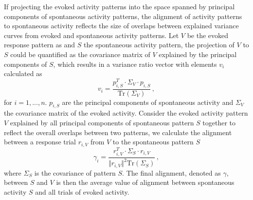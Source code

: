 \documentclass[11pt]{article}
\begin{document}
	If projecting the evoked activity patterns into the space spanned by principal components of spontaneous activity patterns, the alignment of activity patterns to spontaneous activity reflects the size of overlaps between explained variance curves from evoked and spontaneous activity patterns. 
	Let $V$ be the evoked response pattern as and $S$ the spontaneous activity pattern, the projection of $V$ to $S$ could be quantified as the covariance matrix of $V$ explained by the principal components of $S$, which results in a variance ratio vector with elements $v_i$ calculated as
		\begin{equation} \label{eq:var_explain_spont_act_sym}
			v_i = \frac{p_{i, S}^T \cdot \Sigma_V \cdot p_{i, S}}{\text{Tr}(\Sigma_V)} \, , 
		\end{equation}
	for $i = 1, ..., n$. $p_{i, S}$ are the principal components of spontaneous activity and $\Sigma_V$ the covariance matrix of the evoked activity. 
	Consider the evoked activity pattern $V$ explained by all principal components of spontaneous pattern $S$ together to reflect the overall overlaps between two patterns, we calculate the alignment between a response trial $r_{i, V}$ from $V$ to the spontaneous pattern $S$ 
		\begin{equation} \label{eq:align_to_spont_act_sym}
			\gamma_i = \frac{r^T_{i, V} \cdot \Sigma_S \cdot r_{i,V}}{\Vert r_{i, V} \Vert^2 \text{Tr}(\Sigma_S)}\, ,
		\end{equation}
	where $\Sigma_S$ is the covariance of pattern $S$. The final alignment, denoted as $\gamma$, between $S$ and $V$ is then the average value of alignment between spontaneous activity $S$ and all trials of evoked activity. 
	
\end{document}
